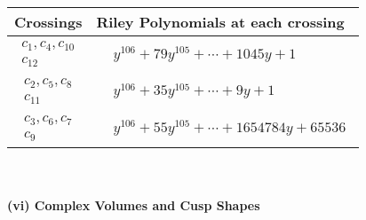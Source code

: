 \documentclass[1p]{elsarticle_modified}
\theoremstyle{definition}
\begin{document}
\begin{tabular}{m{50pt}|m{274pt}}
Crossings & \hspace{64pt}Riley Polynomials at each crossing \\
\hline $$\begin{aligned}c_{1},c_{4},c_{10}\\c_{12}\end{aligned}$$&$\begin{aligned}
&y^{106}+79 y^{105}+\cdots+1045 y+1
\end{aligned}$\\
\hline $$\begin{aligned}c_{2},c_{5},c_{8}\\c_{11}\end{aligned}$$&$\begin{aligned}
&y^{106}+35 y^{105}+\cdots+9 y+1
\end{aligned}$\\
\hline $$\begin{aligned}c_{3},c_{6},c_{7}\\c_{9}\end{aligned}$$&$\begin{aligned}
&y^{106}+55 y^{105}+\cdots+1654784 y+65536
\end{aligned}$\\
\hline
\end{tabular}\\~\\
\newpage\flushleft \textbf{(vi) Complex Volumes and Cusp Shapes}
\end{document}
